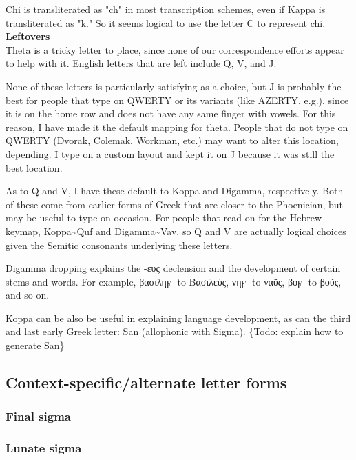 \documentclass[11pt]{article}
\begin{document}
Chi is transliterated as "ch" in most transcription schemes, even if Kappa is transliterated as "k." So it seems logical to use the letter C to represent chi. \\

\noindent \textbf{Leftovers} \\

Theta is a tricky letter to place, since none of our correspondence efforts appear to help with it. English letters that are left include Q, V, and J.

None of these letters is particularly satisfying as a choice, but J is probably the best for people that type on QWERTY or its variants (like AZERTY, e.g.), since it is on the home row and does not have any same finger with vowels. For this reason, I have made it the default mapping for theta. People that do not type on QWERTY (Dvorak, Colemak, Workman, etc.) may want to alter this location, depending. I type on a custom layout and kept it on J because it was still the best location.

As to Q and V, I have these default to Koppa and Digamma, respectively. Both of these come from earlier forms of Greek that are closer to the Phoenician, but may be useful to type on occasion. For people that read on for the Hebrew keymap, Koppa\textasciitilde{}Quf and Digamma\textasciitilde{}Vav, so Q and V are actually logical choices given the Semitic consonants underlying these letters.

Digamma dropping explains the -ευς declension and the development of certain stems and words. For example, βασιληϝ- to Βασιλεύς, νηϝ- to ναῦς, βοϝ- to βοῦς, and so on.

Koppa can be also be useful in explaining language development, as can the third and last early Greek letter: San (allophonic with Sigma). \{Todo: explain how to generate San\}

\subsection{Context-specific/alternate letter forms}
\label{sec:org5a94332}

\subsubsection{Final sigma}
\label{sec:orgea969f1}

\subsubsection{Lunate sigma}
\label{sec:org2bf0e2f}
\end{document}
